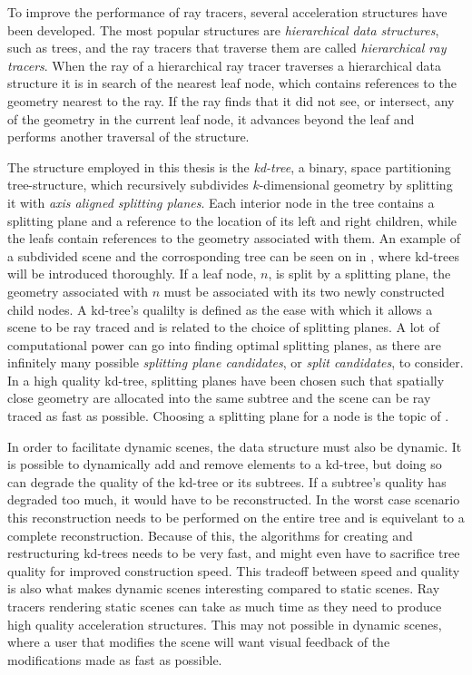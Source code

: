 
To improve the performance of ray tracers, several acceleration
structures have been developed. The most popular structures are
\textit{hierarchical data structures}, such as trees, and the ray
tracers that traverse them are called \textit{hierarchical ray
  tracers}. When the ray of a hierarchical ray tracer traverses a
hierarchical data structure it is in search of the nearest leaf node,
which contains references to the geometry nearest to the ray. If the
ray finds that it did not see, or intersect, any of the geometry in
the current leaf node, it advances beyond the leaf and performs
another traversal of the structure.

The structure employed in this thesis is the \textit{kd-tree}, a binary, space
partitioning tree-structure, which recursively subdivides $k$-dimensional
geometry by splitting it with \textit{axis aligned splitting planes}. Each
interior node in the tree contains a splitting plane and a reference to the
location of its left and right children, while the leafs contain references to
the geometry associated with them. An example of a subdivided scene and the
corrosponding tree can be seen on  in
, where kd-trees will be introduced thoroughly. If a
leaf node, $n$, is split by a splitting plane, the geometry associated with $n$
must be associated with its two newly constructed child nodes. A kd-tree's
qualilty is defined as the ease with which it allows a scene to be ray traced
and is related to the choice of splitting planes. A lot of computational power
can go into finding optimal splitting planes, as there are infinitely many
possible \textit{splitting plane candidates}, or \textit{split candidates}, to
consider. In a high quality kd-tree, splitting planes have been chosen such that
spatially close geometry are allocated into the same subtree and the scene can
be ray traced as fast as possible. Choosing a splitting plane for a node is the
topic of .

In order to facilitate dynamic scenes, the data structure must also be
dynamic. It is possible to dynamically add and remove elements to a kd-tree, but
doing so can degrade the quality of the kd-tree or its subtrees. If a subtree's
quality has degraded too much, it would have to be reconstructed. In the worst
case scenario this reconstruction needs to be performed on the entire tree and
is equivelant to a complete reconstruction. Because of this, the algorithms for
creating and restructuring kd-trees needs to be very fast, and might even have
to sacrifice tree quality for improved construction speed. This tradeoff between
speed and quality is also what makes dynamic scenes interesting compared to
static scenes. Ray tracers rendering static scenes can take as much time as they
need to produce high quality acceleration structures. This may not possible in
dynamic scenes, where a user that modifies the scene will want visual feedback
of the modifications made as fast as possible.

